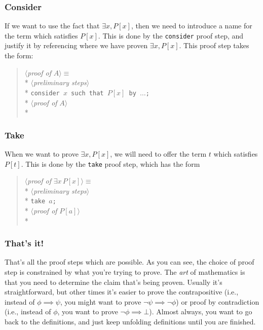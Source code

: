 \subsubsection{Consider}
If we want to use the fact that $\exists x,P[x]$, then we need to
introduce a name for the term which satisfies $P[x]$. This is done by
the \verb|consider| proof step, and justify it by referencing where we
have proven $\exists x,P[x]$. This proof step takes the form:
\begin{verse}
$\langle${\em proof of \/}$A\rangle \equiv$\\*
\qquad $\langle${\em preliminary steps\/}$\rangle$\\*
\qquad \verb|consider |$x$\verb| such that |$P[x]$\verb| by |$\ldots$\verb|;|\\*
\qquad $\langle${\em proof of \/}$A\rangle$\\*
\end{verse}

\subsubsection{Take}
When we want to prove $\exists x,P[x]$, we will need to offer the term
$t$ which satisfies $P[t]$. This is done by the \verb|take| proof step,
which has the form
\begin{verse}
$\langle${\em proof of \/}$\exists x\,P[x]\rangle \equiv$\\*
\qquad $\langle${\em preliminary steps\/}$\rangle$\\*
\qquad \verb|take |$a$\verb|;|\\*
\qquad $\langle${\em proof of \/}$P[a]\rangle$\\*
\end{verse}

\subsubsection{That's it!}
That's all the proof steps which are possible. As you can see, the
choice of proof step is constrained by what you're trying to prove. The
\emph{art} of mathematics is that you need to determine the claim that's
being proven. Usually it's straightforward, but other times it's easier
to prove the contrapositive (i.e., instead of $\phi\implies\psi$, you
might want to prove $\neg\psi\implies\neg\phi$) or proof by
contradiction (i.e., instead of $\phi$, you want to prove
$\neg\phi\implies\bot$). Almost always, you want to go back to the
definitions, and just keep unfolding definitions until you are finished.
